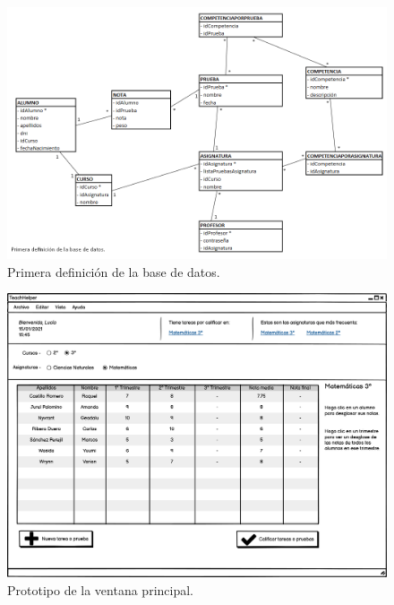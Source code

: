 \begin{figure}[h]
\centering\includegraphics[width=1\linewidth]{figs/DB_Definition_1.png}
\caption{Primera definición de la base de datos.}
\label{Fig:db_definition1}
\end{figure}

\begin{figure}[h]
\centering\includegraphics[width=1\linewidth]{figs/mockup_mainwindow.png}
\caption{Prototipo de la ventana principal.}
\label{Fig:mockup_mainwindow}
\end{figure}

